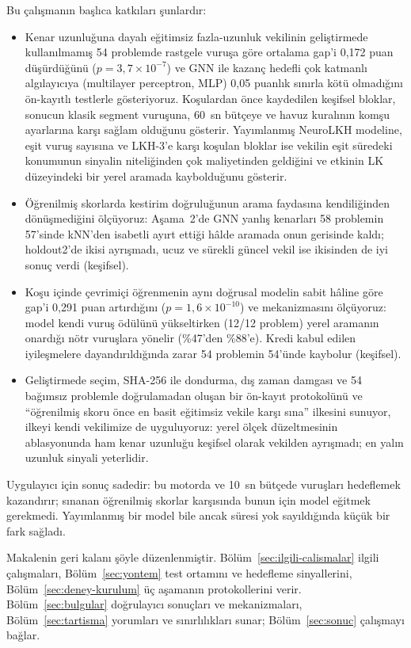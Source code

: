 Bu çalışmanın başlıca katkıları şunlardır:
\begin{itemize}
  \item Kenar uzunluğuna dayalı eğitimsiz fazla-uzunluk vekilinin geliştirmede kullanılmamış 54 problemde rastgele vuruşa göre ortalama
  gap'i 0,172 puan düşürdüğünü ($p=3{,}7\times10^{-7}$) ve GNN ile kazanç hedefli çok katmanlı
  algılayıcıya (multilayer perceptron, MLP) 0,05 puanlık sınırla kötü olmadığını ön-kayıtlı
  testlerle gösteriyoruz. Koşulardan önce kaydedilen keşifsel bloklar, sonucun klasik segment
  vuruşuna, 60~sn bütçeye ve havuz kuralının komşu ayarlarına karşı sağlam olduğunu gösterir.
  Yayımlanmış NeuroLKH modeline, eşit vuruş sayısına ve LKH-3'e karşı koşulan bloklar ise vekilin
  eşit süredeki konumunun sinyalin niteliğinden çok maliyetinden geldiğini ve etkinin LK düzeyindeki
  bir yerel aramada kaybolduğunu gösterir.
  \item Öğrenilmiş skorlarda kestirim doğruluğunun arama faydasına kendiliğinden dönüşmediğini
  ölçüyoruz: Aşama~2'de GNN yanlış kenarları 58 problemin 57'sinde kNN'den isabetli ayırt ettiği
  hâlde aramada onun gerisinde kaldı; holdout2'de ikisi ayrışmadı, ucuz ve sürekli güncel vekil ise
  ikisinden de iyi sonuç verdi (keşifsel).
  \item Koşu içinde çevrimiçi öğrenmenin aynı doğrusal modelin sabit hâline göre gap'i 0,291 puan
  artırdığını ($p=1{,}6\times10^{-10}$) ve mekanizmasını ölçüyoruz: model kendi vuruş ödülünü
  yükseltirken (12/12 problem) yerel aramanın onardığı nötr vuruşlara yönelir (\%47'den \%88'e).
  Kredi kabul edilen iyileşmelere dayandırıldığında zarar 54 problemin 54'ünde kaybolur (keşifsel).
  \item Geliştirmede seçim, SHA-256 ile dondurma, dış zaman damgası ve 54 bağımsız problemle
  doğrulamadan oluşan bir ön-kayıt protokolünü ve ``öğrenilmiş skoru önce en basit eğitimsiz vekile
  karşı sına'' ilkesini sunuyor, ilkeyi kendi vekilimize de uyguluyoruz: yerel ölçek düzeltmesinin
  ablasyonunda ham kenar uzunluğu keşifsel olarak vekilden ayrışmadı; en yalın uzunluk sinyali
  yeterlidir.
\end{itemize}

Uygulayıcı için sonuç sadedir: bu motorda ve 10~sn bütçede vuruşları hedeflemek kazandırır;
sınanan öğrenilmiş skorlar karşısında bunun için model eğitmek gerekmedi. Yayımlanmış bir model
bile ancak süresi yok sayıldığında küçük bir fark sağladı.

Makalenin geri kalanı şöyle düzenlenmiştir.
Bölüm~\ref{sec:ilgili-calismalar} ilgili çalışmaları, Bölüm~\ref{sec:yontem} test ortamını ve
hedefleme sinyallerini, Bölüm~\ref{sec:deney-kurulum} üç aşamanın protokollerini verir.
Bölüm~\ref{sec:bulgular} doğrulayıcı sonuçları ve mekanizmaları, Bölüm~\ref{sec:tartisma}
yorumları ve sınırlılıkları sunar; Bölüm~\ref{sec:sonuc} çalışmayı bağlar.
